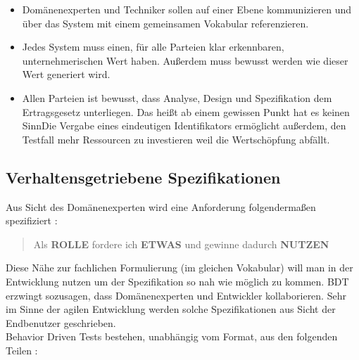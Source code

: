 \begin{itemize}
\item Domänenexperten und Techniker sollen auf einer Ebene kommunizieren und über das System mit einem gemeinsamen Vokabular referenzieren.
\item Jedes System muss einen, für alle Parteien klar erkennbaren, unternehmerischen Wert haben. Außerdem muss bewusst werden wie dieser Wert generiert wird.
\item Allen Parteien ist bewusst, dass Analyse, Design und Spezifikation dem Ertragsgesetz unterliegen. Das heißt ab einem gewissen Punkt hat es keinen SinnDie Vergabe eines eindeutigen Identifikators ermöglicht außerdem, den Testfall mehr Ressourcen zu investieren weil die Wertschöpfung abfällt.
\end{itemize}

\subsection{Verhaltensgetriebene Spezifikationen}
Aus Sicht des Domänenexperten wird eine Anforderung folgendermaßen spezifiziert \cite{north_official_2015}: 

\begin{quote}Als \textbf{ROLLE} fordere ich \textbf{ETWAS} und gewinne dadurch \textbf{NUTZEN}\end{quote}

Diese Nähe zur fachlichen Formulierung (im gleichen Vokabular) will man in der Entwicklung nutzen um der Spezifikation so nah wie möglich zu kommen. \Gls{BDT} erzwingt sozusagen, dass Domänenexperten und Entwickler kollaborieren. Sehr im Sinne der agilen Entwicklung werden solche Spezifikationen aus Sicht der Endbenutzer geschrieben.\\
Behavior Driven Tests bestehen, unabhängig vom Format, aus den folgenden Teilen \cite{haring_bdd_2003}:

